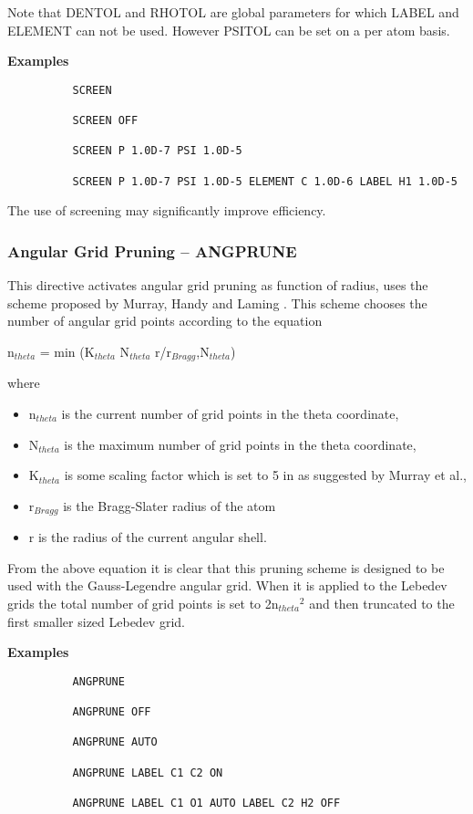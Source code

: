 \documentclass[11pt,fleqn]{article}
\begin{document}
Note that DENTOL and RHOTOL are global parameters for which LABEL and ELEMENT
can not be used. However PSITOL can be set on a per atom basis.


{\bf Examples}

{
\footnotesize
\begin{verbatim}
          SCREEN 

          SCREEN OFF

          SCREEN P 1.0D-7 PSI 1.0D-5

          SCREEN P 1.0D-7 PSI 1.0D-5 ELEMENT C 1.0D-6 LABEL H1 1.0D-5
\end{verbatim}
}

The use of screening may significantly improve efficiency. 

\subsubsection{Angular Grid Pruning -- ANGPRUNE}

This directive activates angular grid pruning as function of radius,
uses the scheme proposed by Murray, Handy and Laming \cite{murray93}.
This scheme chooses the number of angular grid points according to the
equation
\begin{center}
n$_{theta}$  = min (K$_{theta}$ N$_{theta}$ r/r$_{Bragg}$,N$_{theta}$)
\end{center}
where
\begin{itemize}
\item n$_{theta}$ is the current number of grid points in the theta coordinate,
\item N$_{theta}$ is the maximum number of grid points in the theta coordinate,
\item K$_{theta}$ is some scaling factor which is set to 5 in as suggested by 
      Murray et al.,
\item r$_{Bragg}$ is the Bragg-Slater radius of the atom \cite{slater64}
\item r is the radius of the current angular shell.
\end{itemize}
From the above equation it is clear that this pruning scheme is
designed to be used with the Gauss-Legendre angular grid. When it is
applied to the Lebedev grids the total number of grid points is set to
2n$_{theta}$$^2$ and then truncated to the first smaller sized Lebedev
grid.

{\bf Examples}

{
\footnotesize
\begin{verbatim}
          ANGPRUNE

          ANGPRUNE OFF

          ANGPRUNE AUTO

          ANGPRUNE LABEL C1 C2 ON

          ANGPRUNE LABEL C1 O1 AUTO LABEL C2 H2 OFF
\end{verbatim}
}
\end{document}
